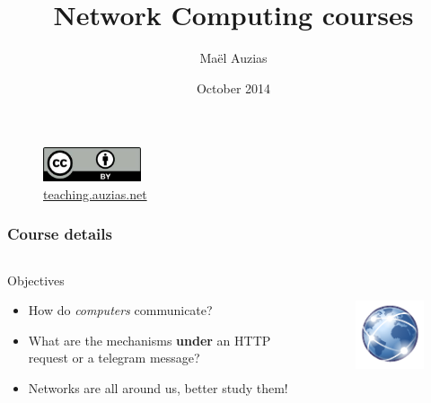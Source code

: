 \documentclass{beamer}
\title{Network Computing courses}
\author{Maël Auzias}
\institute{ENSIBS - UBS}
\date{October 2014}
\begin{document}
\begin{frame}
  \titlepage
  \begin{figure}[p]
      \centering
      \includegraphics[height=1cm]{./imgs/cc40.jpg}
      \caption{\color{blue}\href{http://teaching.auzias.net}{teaching.auzias.net}}
    \label{fig:cc40}
  \end{figure}
\end{frame}


  \begin{frame}
    \frametitle{Course details}
    \begin{columns}
        \begin{block}{Objectives}
          \begin{itemize}
            \item How do \emph{computers} communicate?
            \item What are the mechanisms \textbf{under} an HTTP request or a telegram message?
            \item Networks are all around us, better study them!
          \end{itemize}
        \end{block}
        \begin{figure}[t]
          \centering
          \includegraphics[height=3cm]{./imgs/ntwks.pdf}
          \label{fig:ntwks}
        \end{figure}
    \end{columns}
  \end{frame}
\end{document}
